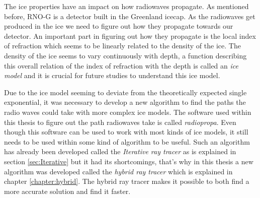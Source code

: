 \documentclass[11pt,a4paper,faculty=we,language=en,doctype=report]{cls/ugent-doc}
\begin{document}
The ice properties have an impact on how radiowaves propagate. As mentioned before, RNO-G is a detector built
in the Greenland icecap. As the radiowaves get produced in the ice we need to figure out how
they propagate towards our detector. An important part in figuring out how they propagate is 
the local index of refraction which seems to be linearly related to the density of the ice. 
The density of the ice seems to vary continuously with depth, a function describing
this overall relation of the index of refraction with the depth is called an \textit{ice model}
and it is crucial for future studies to understand this ice model.

Due to the ice model seeming to deviate from the theoretically expected single exponential, it was necessary to 
develop a new algorithm to find the paths the radio waves could take with more complex ice models. 
The software used within this thesis to figure out the path radiowaves take is called \textit{radiopropa}.
Even though this software can be used to work with most kinds of ice models, it still needs to be used within
some kind of algorithm to be useful. Such an algorithm has already been developed called the \textit{Iterative
ray tracer} as is explained in section \ref{sec:Iterative} but it had its shortcomings,
that's why in this thesis a new algorithm was developed called the \textit{hybrid ray tracer} which is explained
in chapter \ref{chapter:hybrid}. The hybrid ray tracer makes it possible to both find a more accurate solution and find it faster.
\end{document}
